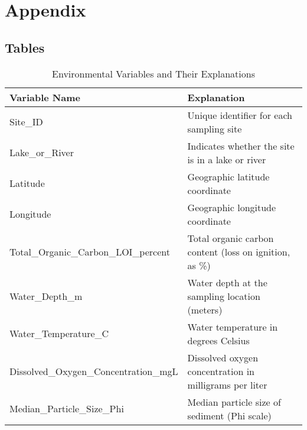 \section{Appendix}

\subsection{Tables}

\begin{table}[htbp]
\centering
\caption{Environmental Variables and Their Explanations}
\label{tab:env_variables}
\renewcommand{\arraystretch}{1.3}
\begin{tabular}{|>{\centering\arraybackslash}m{6cm}|>{\centering\arraybackslash}m{8.5cm}|}
\hline
\textbf{Variable Name} & \textbf{Explanation} \\
\hline
Site\_ID & Unique identifier for each sampling site \\
Lake\_or\_River & Indicates whether the site is in a lake or river \\
Latitude & Geographic latitude coordinate \\
Longitude & Geographic longitude coordinate \\
Total\_Organic\_Carbon\_LOI\_percent & Total organic carbon content (loss on ignition, as \%) \\
Water\_Depth\_m & Water depth at the sampling location (meters) \\
Water\_Temperature\_C & Water temperature in degrees Celsius \\
Dissolved\_Oxygen\_Concentration\_mgL & Dissolved oxygen concentration in milligrams per liter \\
Median\_Particle\_Size\_Phi & Median particle size of sediment (Phi scale) \\
\hline
\end{tabular}
\end{table}

